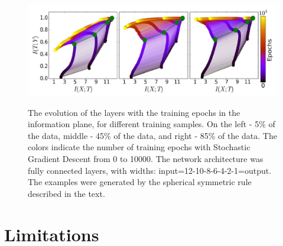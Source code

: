 \documentclass[twocolumn,superscriptaddress,aps]{revtex4-1}
\begin{document}
\begin{figure}[!htb]
\includegraphics[width=\textwidth, height=\textheight, keepaspectratio]{figs/overfitting.jpeg}
\label{fig:overfitting}
\caption{The evolution of the layers with the training epochs in the information plane, for different training samples. On the left - 5\% of the data, middle - 45\% of the data, and right - 85\% of
the data. The colors indicate the number of training epochs with Stochastic Gradient Descent from 0 to 10000. The network architecture was fully connected layers, with widths:
input=12-10-8-6-4-2-1=output. The examples were generated by the spherical symmetric
rule described in the text. }
\end{figure}

\section{Limitations}
\end{document}
